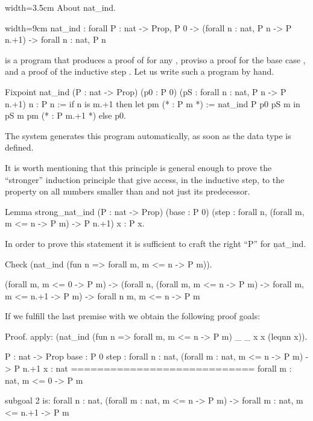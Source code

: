 \begin{coq}{}{width=3.5cm}
About nat_ind.
\end{coq}
\begin{coqout}{}{width=9cm}
nat_ind : forall P : nat -> Prop,
  P 0 -> (forall n : nat, P n -> P n.+1) -> forall n : nat, P n
\end{coqout}
 is a program that produces a proof of  for any ,
proviso a proof for the base case , and a proof
of the inductive step .
Let us write such a program by hand.

\begin{coq}{}{}
Fixpoint nat_ind (P : nat -> Prop)
  (p0 : P 0) (pS : forall n : nat, P n -> P n.+1) n : P n :=
  if n is m.+1 then
    let pm (* : P m *) := nat_ind P p0 pS m in
    pS m pm (* : P m.+1 *)
  else p0.
\end{coq}

The \Coq{} system generates this program automatically, as soon as
 the  data type
is defined. 

It is worth mentioning that this principle is general enough to
prove the ``stronger'' induction principle that give access, in
the inductive step, to the property  on all numbers
smaller than  and not just its predecessor.

\begin{coq}{}{}
Lemma strong_nat_ind (P : nat -> Prop)
  (base : P 0)
  (step : forall n, (forall m, m <= n -> P m) -> P n.+1) x : P x.
\end{coq}{}{}

In order to prove this statement it is sufficient to craft
the right ``P'' for \c{nat_ind}.

\begin{coq}{}{}
Check (nat_ind (fun n => forall m, m <= n -> P m)).
\end{coq}{}{}
\begin{coqout}{}{}
  (forall m, m <= 0 -> P m) ->
  (forall n, (forall m, m <= n -> P m) -> forall m, m <= n.+1 -> P m) ->
  forall n m, m <= n -> P m
\end{coqout}{}{}

If we fulfill the last premise with  we obtain
the following proof goals:

\begin{coq}{}{}
Proof.
apply: (nat_ind (fun n => forall m, m <= n -> P m) _ _ x x (leqnn x)).
\end{coq}{}{}
\begin{coqout}{}{}
  P : nat -> Prop
  base : P 0
  step : forall n : nat, (forall m : nat, m <= n -> P m) -> P n.+1
  x : nat
  ============================
  forall m : nat, m <= 0 -> P m

subgoal 2 is:
 forall n : nat,
 (forall m : nat, m <= n -> P m) -> forall m : nat, m <= n.+1 -> P m
\end{coqout}{}{}

